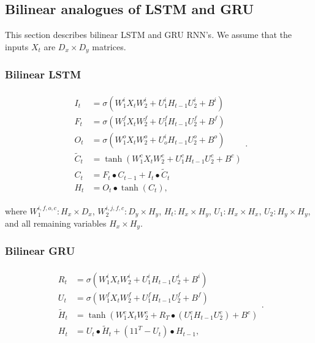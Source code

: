 \documentclass[a4paper,11pt]{article}
\begin{document}
\subsection{Bilinear analogues of LSTM and GRU}

This section describes bilinear LSTM and GRU RNN's. We assume that the inputs $X_{t}$ are $D_{x} \times D_{y}$ matrices. 


\subsubsection{Bilinear LSTM} 

\begin{align}
\begin{split}
I_{t} &=\sigma(W_{1}^{i}X_{t}W_{2}^{i} + U_{1}^{i}H_{t-1}U_{2}^{i}  +  B^{i})\\
F_{t} &=\sigma(W_{1}^{f}X_{t}W_{2}^{f} + U_{1}^{f}H_{t-1}U_{2}^{f}  +  B^{f})\\
O_{t} &=\sigma(W_{1}^{o}X_{t}W_{2}^{o} + U_{o}^{i}H_{t-1}U_{2}^{o}  +  B^{o})\\
\tilde{C}_{t} &=\tanh(W_{1}^{c}X_{t}W_{2}^{c} + U_{1}^{c}H_{t-1}U_{2}^{c}  +  B^{c})\\
C_{t} &= F_{t} \bullet C_{t-1} + I_{t} \bullet \tilde{C}_{t}\\
H_{t} &= O_{t}\bullet \tanh(C_{t}),
\end{split}.
\end{align}

\noindent where  $W_{1}^{i,f,o,c}: H_{x} \times D_{x}$, $W_{2}^{i,j,f,c}:  D_{y} \times H_{y}$, $H_{t}: H_{x} \times H_{y}$, $U_{1}: H_{x} \times H_{x}$, $U_{2}: H_{y} \times H_{y}$, and all remaining variables $H_{x} \times H_{y}$.

\subsubsection{Bilinear GRU} 
\begin{align}
\begin{split}
R_{t} &=\sigma(W_{1}^{i}X_{t}W_{2}^{i} + U_{1}^{i}H_{t-1}U_{2}^{i}  +  B^{i})\\
U_{t} &=\sigma(W_{1}^{f}X_{t}W_{2}^{f} + U_{1}^{f}H_{t-1}U_{2}^{f}  +  B^{f})\\
\tilde{H}_{t} &=\tanh(W_{1}^{c}X_{t}W_{2}^{c} + R_{T} \bullet (U_{1}^{c}H_{t-1}U_{2}^{c})  +  B^{c})\\
H_{t} &= U_{t}\bullet \tilde{H}_{t} + (11^{T} - U_{t})\bullet H_{t-1},
\end{split}.
\end{align}
\end{document}
